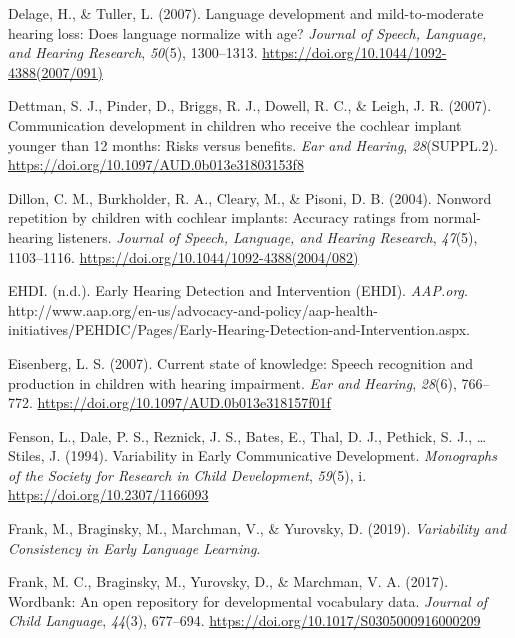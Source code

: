 \documentclass[english,man]{apa6}
\begin{document}
\leavevmode\hypertarget{ref-delage2007}{}%
Delage, H., \& Tuller, L. (2007). Language development and mild-to-moderate hearing loss: Does language normalize with age? \emph{Journal of Speech, Language, and Hearing Research}, \emph{50}(5), 1300--1313. \url{https://doi.org/10.1044/1092-4388(2007/091)}

\leavevmode\hypertarget{ref-dettman2007}{}%
Dettman, S. J., Pinder, D., Briggs, R. J., Dowell, R. C., \& Leigh, J. R. (2007). Communication development in children who receive the cochlear implant younger than 12 months: Risks versus benefits. \emph{Ear and Hearing}, \emph{28}(SUPPL.2). \url{https://doi.org/10.1097/AUD.0b013e31803153f8}

\leavevmode\hypertarget{ref-dillon2004}{}%
Dillon, C. M., Burkholder, R. A., Cleary, M., \& Pisoni, D. B. (2004). Nonword repetition by children with cochlear implants: Accuracy ratings from normal-hearing listeners. \emph{Journal of Speech, Language, and Hearing Research}, \emph{47}(5), 1103--1116. \url{https://doi.org/10.1044/1092-4388(2004/082)}

\leavevmode\hypertarget{ref-ehdi}{}%
EHDI. (n.d.). Early Hearing Detection and Intervention (EHDI). \emph{AAP.org}. http://www.aap.org/en-us/advocacy-and-policy/aap-health-initiatives/PEHDIC/Pages/Early-Hearing-Detection-and-Intervention.aspx.

\leavevmode\hypertarget{ref-eisenberg2007}{}%
Eisenberg, L. S. (2007). Current state of knowledge: Speech recognition and production in children with hearing impairment. \emph{Ear and Hearing}, \emph{28}(6), 766--772. \url{https://doi.org/10.1097/AUD.0b013e318157f01f}

\leavevmode\hypertarget{ref-fenson1994}{}%
Fenson, L., Dale, P. S., Reznick, J. S., Bates, E., Thal, D. J., Pethick, S. J., \ldots{} Stiles, J. (1994). Variability in Early Communicative Development. \emph{Monographs of the Society for Research in Child Development}, \emph{59}(5), i. \url{https://doi.org/10.2307/1166093}

\leavevmode\hypertarget{ref-frank2019}{}%
Frank, M., Braginsky, M., Marchman, V., \& Yurovsky, D. (2019). \emph{Variability and Consistency in Early Language Learning}.

\leavevmode\hypertarget{ref-frank2017}{}%
Frank, M. C., Braginsky, M., Yurovsky, D., \& Marchman, V. A. (2017). Wordbank: An open repository for developmental vocabulary data. \emph{Journal of Child Language}, \emph{44}(3), 677--694. \url{https://doi.org/10.1017/S0305000916000209}
\end{document}
